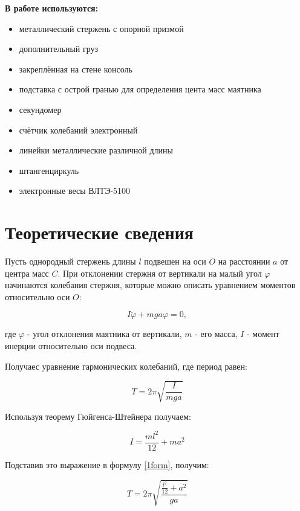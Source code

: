 \documentclass[a4paper,12pt]{article}
\begin{document}
\textbf{В работе используются:} 
\begin{itemize}
    \item металлический стержень с опорной призмой
    \item дополнительный груз
    \item закреплённая на стене консоль
    \item подставка с острой гранью для определения цента масс маятника
    \item секундомер
    \item счётчик колебаний электронный
    \item линейки металлические различной длины
    \item штангенциркуль
    \item электронные весы ВЛТЭ-5100
\end{itemize}
\medskip

\section{Теоретические сведения}

Пусть однородный стержень длины $l$ подвешен на оси $O$ на расстоянии $a$ от центра масс $C$. При отклонении стержня от вертикали на малый угол $\varphi$ начинаются колебания стержня, которые можно описать уравнением моментов относительно оси $O$:

\begin{equation}
    I \ddot{\varphi} + m g a \varphi = 0,
\end{equation}

\noindent
где $\varphi$ - угол отклонения маятника от вертикали, $m$ - его масса, $I$ - момент инерции относительно оси подвеса.

\noindent
Получаес уравнение гармонических колебаний, где период равен:

\begin{equation}\label{1form}
    T = 2\pi \sqrt{\frac{I}{mga}}
\end{equation}

\noindent
Используя теорему Гюйгенса-Штейнера получаем:

\begin{equation}
    I = \frac{ml^2}{12} + m a^2
\end{equation}

Подставив это выражение в формулу \eqref{1form}, получим:

\begin{equation}\label{eq3}
    T = 2\pi \sqrt{\frac{\frac{l^2}{12} + a^2}{g a}}
\end{equation}
\end{document}
